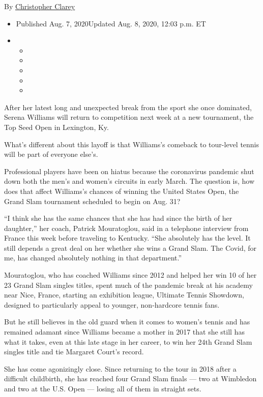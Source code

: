 By \href{https://www.nytimes.com/by/christopher-clarey}{Christopher
Clarey}

\begin{itemize}
\item
  Published Aug. 7, 2020Updated Aug. 8, 2020, 12:03 p.m. ET
\item
  \begin{itemize}
  \item
  \item
  \item
  \item
  \item
  \end{itemize}
\end{itemize}

After her latest long and unexpected break from the sport she once
dominated, Serena Williams will return to competition next week at a new
tournament, the Top Seed Open in Lexington, Ky.

What's different about this layoff is that Williams's comeback to
tour-level tennis will be part of everyone else's.

Professional players have been on hiatus because the coronavirus
pandemic shut down both the men's and women's circuits in early March.
The question is, how does that affect Williams's chances of winning the
United States Open, the Grand Slam tournament scheduled to begin on Aug.
31?

``I think she has the same chances that she has had since the birth of
her daughter,'' her coach, Patrick Mouratoglou, said in a telephone
interview from France this week before traveling to Kentucky. ``She
absolutely has the level. It still depends a great deal on her whether
she wins a Grand Slam. The Covid, for me, has changed absolutely nothing
in that department.''

Mouratoglou, who has coached Williams since 2012 and helped her win 10
of her 23 Grand Slam singles titles, spent much of the pandemic break at
his academy near Nice, France, starting an exhibition league, Ultimate
Tennis Showdown, designed to particularly appeal to younger,
non-hardcore tennis fans.

But he still believes in the old guard when it comes to women's tennis
and has remained adamant since Williams became a mother in 2017 that she
still has what it takes, even at this late stage in her career, to win
her 24th Grand Slam singles title and tie Margaret Court's record.

She has come agonizingly close. Since returning to the tour in 2018
after a difficult childbirth, she has reached four Grand Slam finals ---
two at Wimbledon and two at the U.S. Open --- losing all of them in
straight sets.

